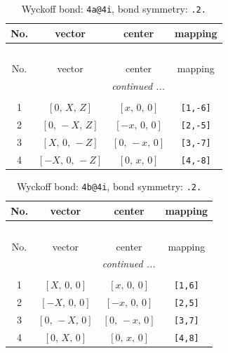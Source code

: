 \documentclass[fleqn,8pt]{jsarticle}
\begin{document}
\begin{longtable}{cccc}
\caption{Wyckoff bond: {\tt 4a@4i}, bond symmetry: {\tt .2.}}
 \\
 \hline \hline
No. & vector & center & mapping \\ \hline \endfirsthead

\multicolumn{3}{l}{\tablename\ \thetable{}} \\
 \hline \hline
No. & vector & center & mapping \\ \hline \endhead

 \hline \hline
\multicolumn{3}{r}{\footnotesize\it continued ...} \\ \endfoot

 \hline \hline
\multicolumn{3}{r}{} \\ \endlastfoot

1 & $\left[ 0,\, X,\, Z \right]$ & $\left[ x,\, 0,\, 0 \right]$ & {\tt [1,-6]} \\ \hline
2 & $\left[ 0,\, - X,\, Z \right]$ & $\left[ - x,\, 0,\, 0 \right]$ & {\tt [2,-5]} \\ \hline
3 & $\left[ X,\, 0,\, - Z \right]$ & $\left[ 0,\, - x,\, 0 \right]$ & {\tt [3,-7]} \\ \hline
4 & $\left[ - X,\, 0,\, - Z \right]$ & $\left[ 0,\, x,\, 0 \right]$ & {\tt [4,-8]} \\
\end{longtable}
\renewcommand{\arraystretch}{1.2}
\begin{longtable}{cccc}
\caption{Wyckoff bond: {\tt 4b@4i}, bond symmetry: {\tt .2.}}
 \\
 \hline \hline
No. & vector & center & mapping \\ \hline \endfirsthead

\multicolumn{3}{l}{\tablename\ \thetable{}} \\
 \hline \hline
No. & vector & center & mapping \\ \hline \endhead

 \hline \hline
\multicolumn{3}{r}{\footnotesize\it continued ...} \\ \endfoot

 \hline \hline
\multicolumn{3}{r}{} \\ \endlastfoot

1 & $\left[ X,\, 0,\, 0 \right]$ & $\left[ x,\, 0,\, 0 \right]$ & {\tt [1,6]} \\ \hline
2 & $\left[ - X,\, 0,\, 0 \right]$ & $\left[ - x,\, 0,\, 0 \right]$ & {\tt [2,5]} \\ \hline
3 & $\left[ 0,\, - X,\, 0 \right]$ & $\left[ 0,\, - x,\, 0 \right]$ & {\tt [3,7]} \\ \hline
4 & $\left[ 0,\, X,\, 0 \right]$ & $\left[ 0,\, x,\, 0 \right]$ & {\tt [4,8]} \\
\end{longtable}
\end{document}
